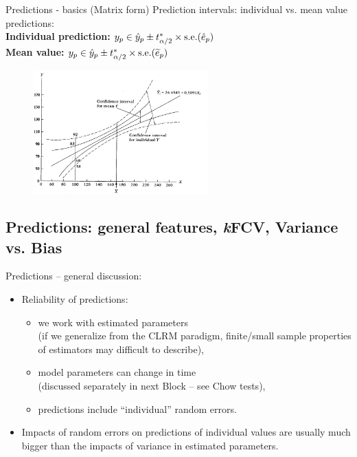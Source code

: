 \documentclass{beamer}
\begin{document}
\begin{frame}{Predictions - basics (Matrix form)}
Prediction intervals: individual vs. mean value predictions:\\
\vspace{0.3cm}
\textbf{Individual prediction:} $y_p \in \hat{y}_p \pm t^*_{\alpha/2} \times \textnormal{s.e.}(\hat{e}_p)$\\
\vspace{0.3cm}
\textbf{Mean value:} \hspace{1.7cm} $y_p \in \hat{y}_p \pm t^*_{\alpha/2} \times \textnormal{s.e.}(\widetilde{e}_p)$

\begin{figure}
\includegraphics[width=0.6\textwidth]{img/P3_PredError.jpg}
\end{figure}

\end{frame}

\subsection{Predictions: general features, \textit{k}FCV, Variance vs. Bias}
\begin{frame}{Predictions -- general discussion:}
\begin{itemize}
\item Reliability of predictions: \\ \bigskip

\begin{itemize}

\item we work with estimated parameters \\(if we generalize from the CLRM paradigm, finite/small sample properties of estimators may difficult to describe),
\medskip
\item model parameters can change in time \\(discussed separately in next Block -- see Chow tests),
\medskip
\item predictions include ``individual'' random errors.
\end{itemize}
\vspace{0.3cm}
\item Impacts of random errors on predictions of individual values are usually much bigger than the impacts of variance in estimated parameters.
\end{itemize}
\end{frame}
\end{document}
